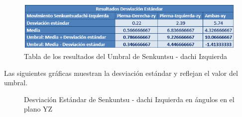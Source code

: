 \begin{figure}[H]%
	\begin{center}
		\includegraphics[scale=1]{./Figuras/Implementacion/Senkuntsudachi_Izquierda_TablaDesvEstandar}
	\end{center}
	\caption{Tabla de los resultados del Umbral de Senkuntsu - dachi Izquierda}
	\label{fig:Senkuntsudachi_Izquierda_TablaDesvEstandar}
\end{figure}
Las siguientes gráficas muestran la desviación estándar y reflejan el valor del umbral.
\begin{figure}[H]
	\centering
	\caption{Desviación Estándar de Senkuntsu - dachi Izquierda en ángulos en el plano YZ}
	\label{fig:DesvEstandar_Senkuntsudachi-Izquierda}
\end{figure}
